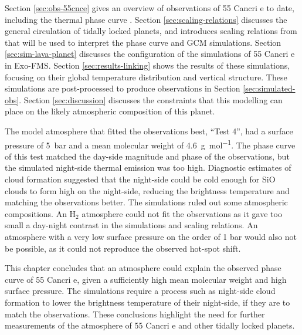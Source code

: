 
Section \ref{sec:obs-55cnce} gives an overview of observations of 55 Cancri e to date, including the thermal phase curve \citep{demory201655cnce}. Section \ref{sec:scaling-relations} discusses the general circulation of tidally locked planets, and introduces scaling relations from \citet{zhang2017dynamics} that will be used to interpret the phase curve and GCM simulations. Section \ref{sec:sim-lava-planet} discusses the configuration of the simulations of 55 Cancri e in Exo-FMS. Section \ref{sec:results-linking} shows the results of these simulations, focusing on their global temperature distribution and vertical structure. These simulations are post-processed to produce observations in Section \ref{sec:simulated-obs}. Section \ref{sec:discussion} discusses the constraints that this modelling can place on the likely atmospheric composition of this planet.


The model atmosphere that fitted the observations best, ``Test 4'', had a surface pressure of \SI{5}{\bar} and a mean molecular weight of \SI{4.6}{\gram\per\mole}. The phase curve of this test matched the day-side magnitude and phase of the observations, but the simulated night-side thermal emission was too high. Diagnostic estimates of cloud formation suggested that the night-side could be cold enough for SiO clouds to form high on the night-side, reducing the brightness temperature and matching the observations better. The simulations ruled out some atmospheric compositions. An H$_{2}$ atmosphere could not fit the observations as it gave too small a day-night contrast in the simulations and scaling relations. An atmosphere with a very low surface pressure on the order of 1 bar would also not be possible, as it could not reproduce the observed hot-spot shift.

This chapter concludes that an atmosphere could explain the observed phase curve of 55 Cancri e, given a sufficiently high mean molecular weight and high surface pressure. The simulations require a process such as night-side cloud formation to lower the brightness temperature of their night-side, if they are to match the observations. These conclusions highlight the need for further measurements of the atmosphere of 55 Cancri e and other tidally locked planets.


%



